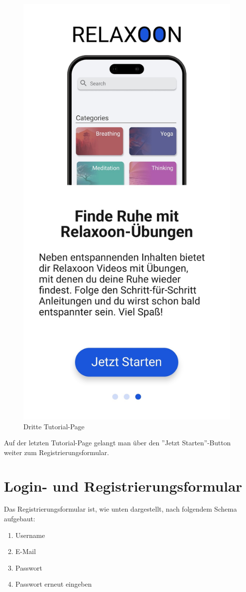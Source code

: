 \begin{figure}[H]
    \centering
    \includegraphics[height=\textwidth]{./pics/Tutorial3.jpg}
    \caption{Dritte Tutorial-Page}
\end{figure}

Auf der letzten Tutorial-Page gelangt man über den ''Jetzt Starten''-Button weiter zum Registrierungsformular.

\section{Login- und Registrierungsformular}

Das Registrierungsformular ist, wie unten dargestellt, nach folgendem Schema aufgebaut:

\begin{enumerate}
    \item Username
    \item E-Mail 
    \item Passwort 
    \item Passwort erneut eingeben
\end{enumerate}

